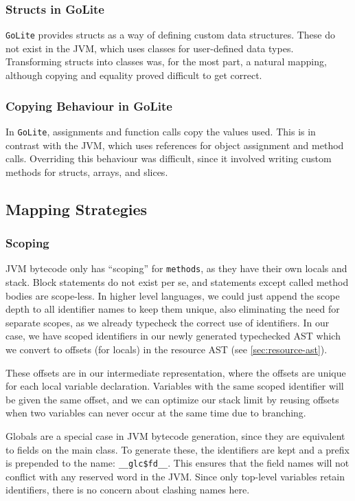 \documentclass[11pt]{article}
\begin{document}
\subsubsection{Structs in GoLite}
\texttt{GoLite} provides structs as a way of defining custom data
structures.  These do not exist in the JVM, which uses classes for
user-defined data types.  Transforming structs into classes was, for
the most part, a natural mapping, although copying and equality proved
difficult to get correct.

\subsubsection{Copying Behaviour in GoLite}
In \texttt{GoLite}, assignments and function calls copy the values
used.  This is in contrast with the JVM, which uses references for
object assignment and method calls. Overriding this behaviour was
difficult, since it involved writing custom methods for structs,
arrays, and slices.

\subsection{Mapping Strategies}
\subsubsection{Scoping}
JVM bytecode only has ``scoping'' for \texttt{methods}, as they have
their own locals and stack. Block statements do not exist per se, and
statements except called method bodies are scope-less. In higher level
languages, we could just append the scope depth to all identifier
names to keep them unique, also eliminating the need for separate
scopes, as we already typecheck the correct use of identifiers. In our
case, we have scoped identifiers in our newly generated typechecked
AST which we convert to offsets (for locals) in the resource AST (see
\ref{sec:resource-ast}).

These offsets are in our intermediate representation, where the
offsets are unique for each local variable declaration. Variables with
the same scoped identifier will be given the same offset, and we can
optimize our stack limit by reusing offsets when two variables can
never occur at the same time due to branching.

Globals are a special case in JVM bytecode generation, since they are
equivalent to fields on the main class. To generate these, the
identifiers are kept and a prefix is prepended to the name:
\texttt{\_\_glc\$fd\_\_}. This ensures that the field names will not
conflict with any reserved word in the JVM. Since only top-level
variables retain identifiers, there is no concern about clashing names
here.
\end{document}
